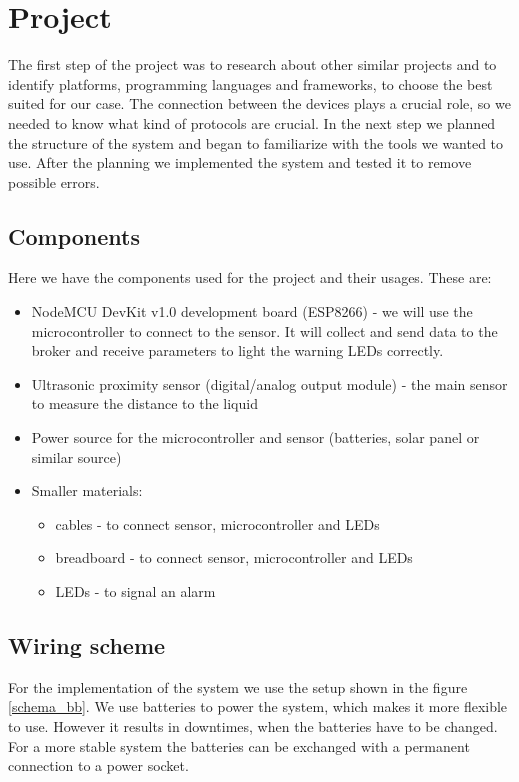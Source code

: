 \documentclass{article}
\begin{document}
\section{Project}

The first step of the project was to research about other similar projects and
to identify platforms, programming languages and frameworks, to choose the best suited for our case. The connection between the devices plays a crucial role, so we needed to know what kind of protocols are crucial. In the next step we planned the structure of the system and began to familiarize with
the tools we wanted to use. After the planning we implemented the system and tested it to remove possible errors.\par

\subsection{Components}
Here we have the components used for the project and their usages. These are:
\begin{itemize}
\item NodeMCU DevKit v1.0 development board (ESP8266) - we will use the
  microcontroller to connect to the sensor. It will collect and send data to the broker and
  receive parameters to light the warning LEDs correctly.
\item Ultrasonic proximity sensor (digital/analog output module) - the main
  sensor to measure the distance to the liquid
\item Power source for the microcontroller and sensor (batteries, solar panel or
  similar source)
\item Smaller materials:
	\begin{itemize}
  \item cables - to connect sensor, microcontroller and LEDs
  \item breadboard - to connect sensor, microcontroller and LEDs
  \item LEDs - to signal an alarm
	\end{itemize}
\end{itemize}

\subsection{Wiring scheme}
For the implementation of the system we use the setup shown in the figure \ref{schema_bb}. We use  batteries to power the system, which makes it more flexible to use. However it results in downtimes, when the batteries have to be changed. For a more stable system the batteries can be exchanged with a permanent connection to a power socket.
\end{document}
